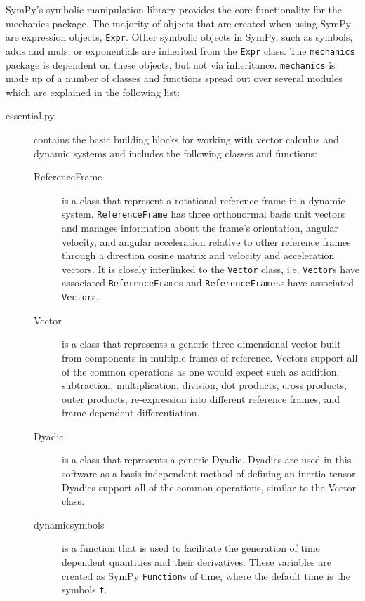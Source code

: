 \documentclass[twocolumn,10pt,final]{asme2e}
\begin{document}
SymPy's symbolic manipulation library provides the core functionality for the
mechanics package. The majority of objects that are created when using SymPy
are expression objects, \verb|Expr|. Other symbolic objects in SymPy, such as
symbols, adds and muls, or exponentials are inherited from the \verb|Expr|
class. The \verb|mechanics| package is dependent on these objects, but not via
inheritance. \verb|mechanics| is made up of a number of classes and functions
spread out over several modules which are explained in the following list:
%
\begin{description}
  \item[essential.py] contains the basic building blocks for working with
    vector calculus and dynamic systems and includes the following classes and
    functions:
    \begin{description}
      \item[ReferenceFrame] is a class that represent a rotational reference
        frame in a dynamic system. \verb|ReferenceFrame| has three orthonormal
        basis unit vectors and manages information about the frame's
        orientation, angular velocity, and angular acceleration relative to
        other reference frames through a direction cosine matrix and velocity
        and acceleration vectors. It is closely interlinked to the
        \verb|Vector| class, i.e. \verb|Vector|s have associated
        \verb|ReferenceFrame|s and \verb|ReferenceFrames|s have associated
        \verb|Vector|s.
      \item[Vector] is a class that represents a generic three dimensional
        vector built from components in multiple frames of reference. Vectors
        support all of the common operations as one would expect such as
        addition, subtraction, multiplication, division, dot products, cross
        products, outer products, re-expression into different reference
        frames, and frame dependent differentiation.
      \item[Dyadic] is a class that represents a generic Dyadic. Dyadics are
      used in this software as a basis independent method of defining an
      inertia tensor. Dyadics support all of the common operations, similar to
      the Vector class.
      \item[dynamicsymbols] is a function that is used to facilitate the generation
        of time dependent quantities and their derivatives. These variables are
        created as SymPy \verb|Function|s of time, where the default time is
        the symbols \verb|t|.
    \end{description}

\end{description}
\end{document}
